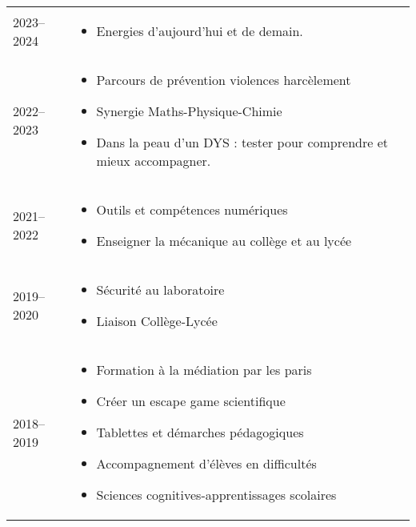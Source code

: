 \documentclass{cv-style-cec}
\begin{document}
\begin{longtable}{lp{12cm}}
    2023--2024 & %
        \vspace{-8pt}
        \begin{itemize}
            \item Energies d'aujourd'hui et de demain.
        \end{itemize} \vspace{-4pt} \\
    2022--2023 & %
        \vspace{-8pt}
        \begin{itemize}
            \item Parcours de prévention violences harcèlement
            \item Synergie Maths-Physique-Chimie
            \item Dans la peau d'un DYS : tester pour comprendre et mieux accompagner.
        \end{itemize} \vspace{-4pt} \\
    2021--2022 & %
        \vspace{-8pt}
        \begin{itemize}
            \item Outils et compétences numériques
            \item Enseigner la mécanique au collège et au lycée
        \end{itemize} \vspace{-4pt} \\
    2019--2020 & %
        \vspace{-8pt}
        \begin{itemize}
            \item Sécurité au laboratoire
            \item Liaison Collège-Lycée
        \end{itemize} \vspace{-4pt} \\
    2018--2019 & %
        \vspace{-8pt}
        \begin{itemize}
            \item Formation à la médiation par les paris
            \item Créer un escape game scientifique
            \item Tablettes et démarches pédagogiques
            \item Accompagnement d'élèves en difficultés
            \item Sciences cognitives-apprentissages scolaires

\end{itemize}
\end{longtable}
\end{document}
